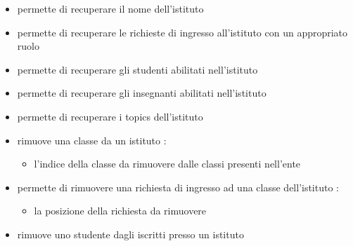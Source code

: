 \begin{itemize}
\newline
\item {}
\newline
permette di recuperare il nome dell'istituto
\newline
\item {}
\newline
permette di recuperare le richieste di ingresso all'istituto con un appropriato ruolo
\newline
\item {}
\newline
permette di recuperare gli studenti abilitati nell'istituto
\newline
\item {}
\newline
permette di recuperare gli insegnanti abilitati nell'istituto
\newline
\item {}
\newline
permette di recuperare i topics dell'istituto
\newline
\item {}
\newline
rimuove una classe da un istituto
\newline
{} :
\begin{itemize}
\item {}
\newline
l'indice della classe da rimuovere dalle classi presenti nell'ente
\end{itemize}
\item {}
\newline
permette di rimuovere una richiesta di ingresso ad una classe dell'istituto
\newline
{} :
\begin{itemize}
\item {}
\newline
la posizione della richiesta da rimuovere
\end{itemize}
\item {}
\newline
rimuove uno studente dagli iscritti presso un istituto
\newline

\end{itemize}
